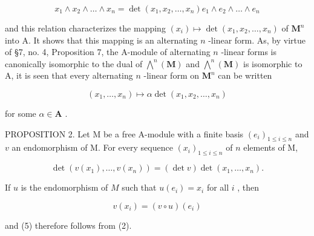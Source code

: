 \[
x _ {1} \wedge x _ {2} \wedge \dots \wedge x _ {n} = \det (x _ {1}, x _ {2}, \dots , x _ {n}) e _ {1} \wedge e _ {2} \wedge \dots \wedge e _ {n}\tag{4}
\]

and this relation characterizes the mapping \((x_{i})\mapsto\det(x_{1},x_{2},\ldots,x_{n})\) of \(\mathbf{M}^{n}\) into A. It shows that this mapping is an alternating \(n\) -linear form. As, by virtue of §7, no. 4, Proposition 7, the A-module of alternating \(n\) -linear forms is canonically isomorphic to the dual of \(\bigwedge^{n}(\mathbf{M})\) and \(\bigwedge^{n}(\mathbf{M})\) is isomorphic to A, it is seen that every alternating \(n\) -linear form on \(\mathbf{M}^{n}\) can be written

\[
(x _ {1}, \dots , x _ {n}) \mapsto \alpha \det (x _ {1}, x _ {2}, \dots , x _ {n})
\]

for some \(\alpha \in \mathbf{A}\) .

PROPOSITION 2. Let M be a free A-module with a finite basis \((e_i)_{1 \leqslant i \leqslant n}\) and \(v\) an endomorphism of M. For every sequence \((x_i)_{1 \leqslant i \leqslant n}\) of \(n\) elements of M,

\[
\det (v (x _ {1}), \dots , v (x _ {n})) = (\det v) \det (x _ {1}, \dots , x _ {n}).\tag{5}
\]

If \(u\) is the endomorphism of \(M\) such that \(u(e_i) = x_i\) for all \(i\) , then

\[
v (x _ {i}) = (v \circ u) (e _ {i})
\]

and (5) therefore follows from (2).

